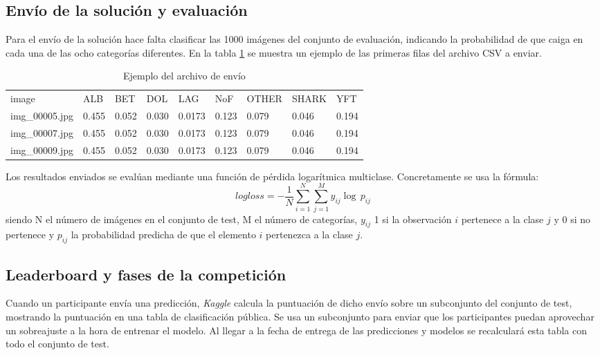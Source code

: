 \subsection{Envío de la solución y evaluación}
\label{sec:envio-y-eval}

Para el envío de la solución hace falta clasificar las 1000 imágenes del conjunto de evaluación, indicando la probabilidad de que caiga en cada una de las ocho categorías diferentes. En la tabla \ref{submission-sample} se muestra un ejemplo de las primeras filas del archivo CSV a enviar.

\begin{table}[]
\centering
\caption{Ejemplo del archivo de envío}
\label{submission-sample}
\begin{tabular}{lllllllll}
image          & ALB   & BET   & DOL   & LAG    & NoF   & OTHER & SHARK  & YFT  \\
img\_00005.jpg & 0.455 & 0.052 & 0.030 & 0.0173 & 0.123 & 0.079 & 0.046 & 0.194\\
img\_00007.jpg & 0.455 & 0.052 & 0.030 & 0.0173 & 0.123 & 0.079 & 0.046 & 0.194\\
img\_00009.jpg & 0.455 & 0.052 & 0.030 & 0.0173 & 0.123 & 0.079 & 0.046 & 0.194
\end{tabular}
\end{table}

Los resultados enviados se evalúan mediante una función de pérdida logarítmica multiclase. Concretamente se usa la fórmula:
\[
  logloss =
  - \frac{1}{N} \sum_{i=1}^N \sum_{j=1}^M y_{ij} \log \, p_{ij}
\]
 siendo N el número de imágenes en el conjunto de test, M el número de categorías, $y_{ij}$ 1 si la observación $i$ pertenece a la clase $j$ y 0 si no pertenece y $p_{ij}$ la probabilidad predicha de que el elemento $i$ pertenezca a la clase $j$.

 \subsection{Leaderboard y fases de la competición}

Cuando un participante envía una predicción, \textit{Kaggle }calcula la puntuación de dicho envío sobre un subconjunto del conjunto de test, mostrando la puntuación en una tabla de clasificación pública. Se usa un subconjunto para enviar que los participantes puedan aprovechar un sobreajuste a la hora de entrenar el modelo. Al llegar a la fecha de entrega de las predicciones y modelos se recalculará esta tabla con todo el conjunto de test.

